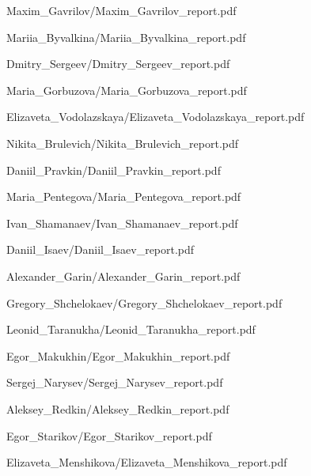 \documentclass[a4paper]{article}
\begin{document}
{Maxim_Gavrilov/Maxim_Gavrilov_report.pdf}

{Mariia_Byvalkina/Mariia_Byvalkina_report.pdf}

{Dmitry_Sergeev/Dmitry_Sergeev_report.pdf}

{Maria_Gorbuzova/Maria_Gorbuzova_report.pdf}

{Elizaveta_Vodolazskaya/Elizaveta_Vodolazskaya_report.pdf}

{Nikita_Brulevich/Nikita_Brulevich_report.pdf}

{Daniil_Pravkin/Daniil_Pravkin_report.pdf}

{Maria_Pentegova/Maria_Pentegova_report.pdf}

{Ivan_Shamanaev/Ivan_Shamanaev_report.pdf}

{Daniil_Isaev/Daniil_Isaev_report.pdf}

{Alexander_Garin/Alexander_Garin_report.pdf}

{Gregory_Shchelokaev/Gregory_Shchelokaev_report.pdf}

{Leonid_Taranukha/Leonid_Taranukha_report.pdf}

{Egor_Makukhin/Egor_Makukhin_report.pdf}

{Sergej_Narysev/Sergej_Narysev_report.pdf}


{Aleksey_Redkin/Aleksey_Redkin_report.pdf}

{Egor_Starikov/Egor_Starikov_report.pdf}

{Elizaveta_Menshikova/Elizaveta_Menshikova_report.pdf}
\end{document}
